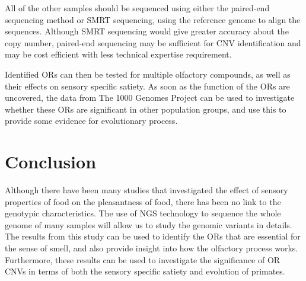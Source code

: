 \documentclass[a4paper, 12pt]{article}
\begin{document}
All of the other samples should be sequenced using either the paired-end sequencing method or SMRT sequencing, using the reference genome to align the sequences.
Although SMRT sequencing would give greater accuracy about the copy number, paired-end sequencing may be sufficient for CNV identification and may be cost efficient with less technical expertise requirement.

Identified ORs can then  be tested for multiple olfactory compounds, as well as their effects on sensory specific satiety.
As soon as the function of the ORs are uncovered, the data from The 1000 Genomes Project can be used to investigate whether these ORs are significant in other population groups, and use this to provide some evidence for evolutionary process.

\section*{Conclusion}

Although there have been many studies that investigated the effect of sensory properties of food on the pleasantness of food, there has been no link to the genotypic characteristics.
The use of NGS technology to sequence the whole genome of many samples will allow us to study the genomic variants in details.
The results from this study can be used to identify the ORs that are essential for the sense of smell, and also provide insight into how the olfactory process works.
Furthermore, these results can be used to investigate the significance of OR CNVs in terms of  both the sensory specific satiety and evolution of primates.


\newpage



\end{document}

